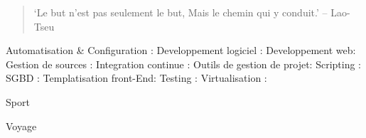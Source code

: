 
\begin{quote}
`Le but n'est pas seulement le but,
Mais le chemin qui y conduit.' – Lao-Tseu
\end{quote}


Automatisation & Configuration :  
\hfill \break \break
Developpement logiciel :   
\hfill \break \break
Developpement web:  
\hfill \break \break
Gestion de sources :   
\hfill \break \break
Integration continue :   
\hfill \break \break
Outils de gestion de projet:  
\hfill \break \break
Scripting :   
\hfill \break \break
SGBD :   
\hfill \break \break
Templatisation front-End:  
\hfill \break \break
Testing :   
\hfill \break \break
Virtualisation :   


\divider

\divider



\medskip
{}

\textmd{Sport} \smallskip
{}
\divider

\textmd{Voyage} \smallskip
{}


